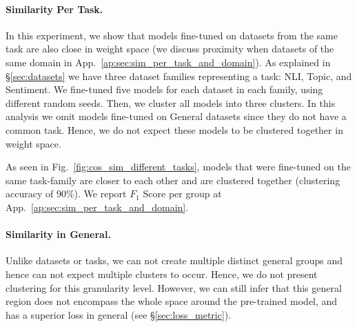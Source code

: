 \documentclass[nohyperref]{article}
\theoremstyle{plain}
\theoremstyle{definition}
\theoremstyle{remark}
\begin{document}
\paragraph{Similarity Per Task.}
In this experiment, we show that models fine-tuned on datasets from the same task are also close in weight space (we discuss proximity when datasets of the same domain in App.~\ref{ap:sec:sim_per_task_and_domain}). As explained in \S\ref{sec:datasets} we have three dataset families representing a task: NLI, Topic, and Sentiment. We fine-tuned five models for each dataset in each family, using different random seeds. Then, we cluster all models into three clusters. In this analysis we omit models fine-tuned on General datasets since they do not have a common task. Hence, we do not expect these models to be clustered together in weight space. 

As seen in Fig.~\ref{fig:cos_sim_different_tasks}, models that were fine-tuned on the same task-family are closer to each other and are clustered together (clustering accuracy of 90\%). We report $F_1$ Score per group at App.~\ref{ap:sec:sim_per_task_and_domain}.





\paragraph{Similarity in General.}
Unlike datasets or tasks, we can not create multiple distinct general groups and hence can not expect multiple clusters to occur. Hence, we do not present clustering for this granularity level. However, we can still infer that this general region does not encompass the whole space around the pre-trained model, and has a superior loss in general (see \S\ref{sec:loss_metric}).
\end{document}
